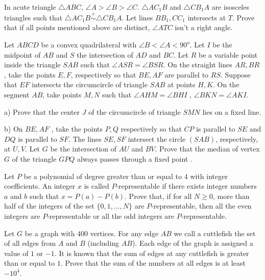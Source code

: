 \documentclass[11pt]{scrartcl}
\begin{document}
\begin{problem}[8534263250311217423]
	In acute triangle $\triangle {ABC}$, $\angle 
A > \angle B > \angle C$. $\triangle {AC_1B}$ and $\triangle {CB_1A}$ are isosceles triangles such that $\triangle {AC_1B} \stackrel{+}{\sim}  \triangle {CB_1A}$. Let lines $BB_1, CC_1$ intersects at ${T}$. Prove that if all points mentioned above are distinct, $\angle ATC$ isn't a right angle.
\end{problem}
\begin{problem}[1613309914397651478]
Let $ABCD$ be a convex quadrilateral with $\angle B < \angle A < 90^{o}$. Let $I$ be the midpoint of $AB$ and $S$ the intersection of $AD$ and $BC$. Let $R$ be a variable point inside the triangle $SAB$ such that $\angle ASR = \angle BSR$. On the straight lines $AR, BR$ , take the points $E, F$, respectively so that $BE , AF$ are parallel to $RS$. Suppose that $EF$ intersects the circumcircle of triangle $SAB$ at points $H, K$. On the segment $AB$, take points $M , N$ such that $\angle AHM =\angle BHI$ , $\angle BKN = \angle AKI$.

a) Prove that the center $J$ of the circumcircle of triangle $SMN$ lies on a fixed line.

b) On $BE, AF$ , take the points $P, Q$ respectively so that $CP$ is parallel to $SE$ and $DQ$ is parallel to $SF$. The lines $SE, SF$ intersect the circle $(SAB)$, respectively, at $U, V$. Let $G$ be the intersection of $AU$ and $BV$. Prove that the median of vertex $G$ of the triangle $GPQ$ always passes through a fixed point .
\end{problem}
\begin{problem}[140536805208587401]
Let $P$ be a polynomial of degree greater than or equal to $4$ with integer coefficients. An integer $x$ is called $P$-representable if there exists integer numbers $a$ and $b$ such that $x = P(a) - P(b)$. Prove that, if for all $N \geq 0$, more than half of the integers of the set $\{0,1,\dots,N\}$ are $P$-representable, then all the even integers are $P$-representable or all the odd integers are $P$-representable.
\end{problem}
\begin{problem}[5347245479409093202]
Let $G$ be a graph with $400$ vertices. For any edge $AB$ we call a cuttlefish the set of all edges from $A$ and $B$ (including $AB$). Each edge of the graph is assigned a value of $1$ or $-1$. It is known that the sum of edges at any cuttlefish is greater than or equal to $1$.
Prove that the sum of the numbers at all edges is at least $-10^4$.
\end{problem}
\end{document}
